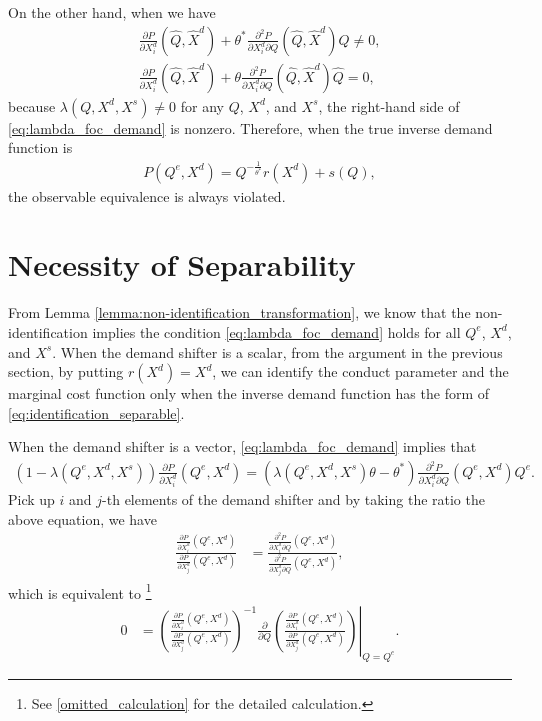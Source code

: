 \documentclass[11pt, a4paper]{article}
\theoremstyle{remark}
\begin{document}
On the other hand, when we have
\begin{align}
    \frac{\partial P}{\partial X^{d}_i}(\hat{Q}, \hat{X}^{d}) + \theta^{*}\frac{\partial^2 P}{\partial X^{d}_{i}\partial Q}(\hat{Q}, \hat{X}^{d})\hat{Q}  \ne  0,\\
    \frac{\partial P}{\partial X^{d}_i}(\hat{Q}, \hat{X}^{d}) + \theta\frac{\partial^2 P}{\partial X^{d}_{i}\partial Q}(\hat{Q}, \hat{X}^{d})\hat{Q}  = 0,
\end{align}
because $\lambda(Q, X^{d}, X^{s}) \ne 0$ for any $Q$, $X^{d}$, and $X^{s}$, the right-hand side of \eqref{eq:lambda_foc_demand} is nonzero.
Therefore, when the true inverse demand function is
\begin{align}
    P(Q^e, X^{d}) = Q^{-\frac{1}{\theta^{*}}} r(X^{d}) + s(Q),
\end{align}
the observable equivalence is always violated.






\section{Necessity of Separability}

From Lemma \ref{lemma:non-identification_transformation}, we know that the non-identification implies the condition \eqref{eq:lambda_foc_demand} holds for all $Q^e$, $X^{d}$, and $X^{s}$.
When the demand shifter is a scalar, from the argument in the previous section, by putting $r(X^{d}) = X^{d}$, we can identify the conduct parameter and the marginal cost function only when the inverse demand function has the form of \eqref{eq:identification_separable}.

When the demand shifter is a vector, \eqref{eq:lambda_foc_demand} implies that
\begin{align}
    (1 - \lambda(Q^e, X^{d}, X^{s}))\frac{\partial P}{\partial X^{d}_i}(Q^e, X^{d}) = (\lambda(Q^e, X^{d}, X^{s})\theta -  \theta^{*})\frac{\partial^2 P}{\partial X^{d}_i\partial Q}(Q^e, X^{d})Q^e.
\end{align}
Pick up $i$ and $j$-th elements of the demand shifter and by taking the ratio the above equation, we have
\begin{align}
    \frac{\frac{\partial P}{\partial X^{d}_{i}}(Q^e, X^{d})}{\frac{\partial P}{\partial X^{d}_{j}}(Q^e, X^{d})} & = \frac{ \frac{\partial^2 P}{\partial X^{d}_{i} \partial Q}(Q^e, X^{d})}{\frac{\partial^2 P}{\partial X^{d}_{j} \partial Q}(Q^e, X^{d})},
\end{align}
which is equivalent to \footnote{See \ref{omitted_calculation} for the detailed calculation.}
\begin{align}
    0 & = \left. \left(\frac{\frac{\partial P}{\partial X^{d}_{i}}(Q^e, X^{d})}{\frac{\partial P}{\partial X^{d}_{j}}(Q^e, X^{d})}\right)^{-1} \frac{\partial}{\partial Q} \left(\frac{\frac{\partial P}{\partial X^{d}_{i}}(Q^e, X^{d})}{\frac{\partial P}{\partial X^{d}_{j}}(Q^e, X^{d})}\right) \right|_{Q = Q^e}.
    \label{eq:derivative_separable}
\end{align}
\end{document}
